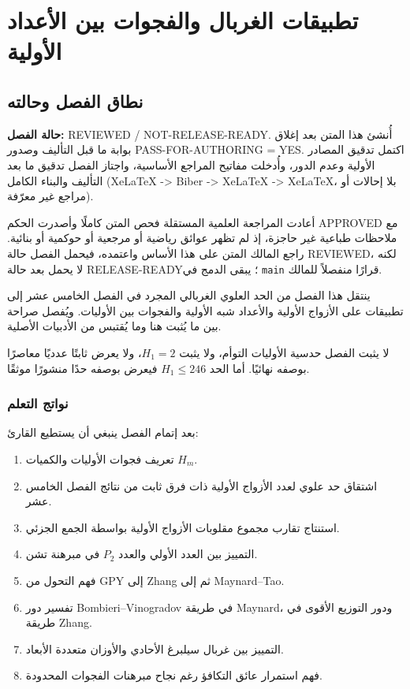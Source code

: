 \chapter{تطبيقات الغربال والفجوات بين الأعداد الأولية}

\section{نطاق الفصل وحالته}

\noindent\textbf{حالة الفصل:}
\textenglish{REVIEWED / NOT-RELEASE-READY}.
أُنشئ هذا المتن بعد إغلاق بوابة ما قبل التأليف وصدور
\textenglish{PASS-FOR-AUTHORING = YES}. اكتمل تدقيق المصادر الأولية وعدم الدور،
وأُدخلت مفاتيح المراجع الأساسية، واجتاز الفصل تدقيق ما بعد التأليف والبناء الكامل
(\textenglish{XeLaTeX -> Biber -> XeLaTeX -> XeLaTeX}، بلا إحالات أو مراجع غير معرّفة).

أعادت المراجعة العلمية المستقلة فحص المتن كاملًا وأصدرت الحكم
\textenglish{APPROVED} مع ملاحظات طباعية غير حاجزة، إذ لم تظهر عوائق رياضية أو
مرجعية أو حوكمية أو بنائية. راجع المالك المتن على هذا الأساس واعتمده، فيحمل
الفصل حالة \textenglish{REVIEWED}، لكنه لا يحمل بعد حالة
\textenglish{RELEASE-READY}؛ يبقى الدمج في \texttt{main} قرارًا منفصلاً للمالك.

ينتقل هذا الفصل من الحد العلوي الغربالي المجرد في الفصل الخامس عشر إلى تطبيقات
على الأزواج الأولية والأعداد شبه الأولية والفجوات بين الأوليات. ويُفصل صراحة بين
ما يُثبت هنا وما يُقتبس من الأدبيات الأصلية.

لا يثبت الفصل حدسية الأوليات التوأم، ولا يثبت \(H_1=2\)، ولا يعرض ثابتًا عدديًا
معاصرًا بوصفه نهائيًا. أما الحد \(H_1\le246\) فيعرض بوصفه حدًا منشورًا موثقًا.

\subsection{نواتج التعلم}

بعد إتمام الفصل ينبغي أن يستطيع القارئ:
\begin{enumerate}
  \item تعريف فجوات الأوليات والكميات \(H_m\).
  \item اشتقاق حد علوي لعدد الأزواج الأولية ذات فرق ثابت من نتائج الفصل الخامس عشر.
  \item استنتاج تقارب مجموع مقلوبات الأزواج الأولية بواسطة الجمع الجزئي.
  \item التمييز بين العدد الأولي والعدد \(P_2\) في مبرهنة تشن.
  \item فهم التحول من GPY إلى Zhang ثم إلى Maynard--Tao.
  \item تفسير دور Bombieri--Vinogradov في طريقة Maynard، ودور التوزيع الأقوى في طريقة Zhang.
  \item التمييز بين غربال سيلبرغ الأحادي والأوزان متعددة الأبعاد.
  \item فهم استمرار عائق التكافؤ رغم نجاح مبرهنات الفجوات المحدودة.
\end{enumerate}

